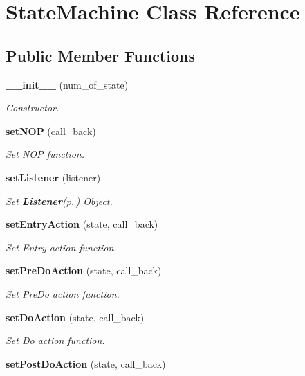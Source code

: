 \section{State\-Machine Class Reference}
\label{classStateMachine}
\subsection*{Public Member Functions}
\begin{CompactItemize}
\item 
{\bf \_\-\_\-init\_\-\_\-} (num\_\-of\_\-state)
\begin{CompactList}\small\item\em Constructor. \item\end{CompactList}\item 
{\bf set\-NOP} (call\_\-back)
\begin{CompactList}\small\item\em Set NOP function. \item\end{CompactList}\item 
{\bf set\-Listener} (listener)
\begin{CompactList}\small\item\em Set {\bf Listener}{\rm (p.\,\pageref{namespaceListener})} Object. \item\end{CompactList}\item 
{\bf set\-Entry\-Action} (state, call\_\-back)
\begin{CompactList}\small\item\em Set Entry action function. \item\end{CompactList}\item 
{\bf set\-Pre\-Do\-Action} (state, call\_\-back)
\begin{CompactList}\small\item\em Set Pre\-Do action function. \item\end{CompactList}\item 
{\bf set\-Do\-Action} (state, call\_\-back)
\begin{CompactList}\small\item\em Set Do action function. \item\end{CompactList}\item 
{\bf set\-Post\-Do\-Action} (state, call\_\-back)

\end{CompactItemize}
